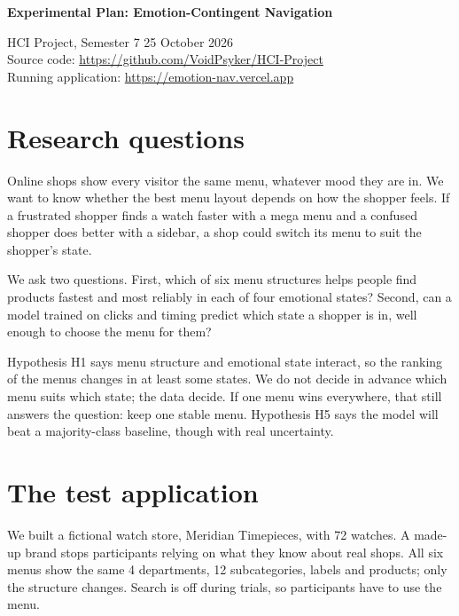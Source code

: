 \documentclass[10pt,a4paper]{article}
\begin{document}
{\LARGE\bfseries Experimental Plan: Emotion-Contingent Navigation}\par
\vspace{2pt}
HCI Project, Semester 7 \textperiodcentered{} 25 October 2026\\
Source code: \url{https://github.com/VoidPsyker/HCI-Project}\\
Running application: \url{https://emotion-nav.vercel.app}

\section{Research questions}

Online shops show every visitor the same menu, whatever mood they are in. We want to know
whether the best menu layout depends on how the shopper feels. If a frustrated shopper finds
a watch faster with a mega menu and a confused shopper does better with a sidebar, a shop
could switch its menu to suit the shopper's state.

We ask two questions. First, which of six menu structures helps people find products fastest
and most reliably in each of four emotional states? Second, can a model trained on clicks
and timing predict which state a shopper is in, well enough to choose the menu for them?

Hypothesis H1 says menu structure and emotional state interact, so the ranking of the menus
changes in at least some states. We do not decide in advance which menu suits which state;
the data decide. If one menu wins everywhere, that still answers the question: keep one
stable menu. Hypothesis H5 says the model will beat a majority-class baseline, though with
real uncertainty.

\section{The test application}

We built a fictional watch store, Meridian Timepieces, with 72 watches. A made-up brand
stops participants relying on what they know about real shops. All six menus show the same
4 departments, 12 subcategories, labels and products; only the structure changes. Search is
off during trials, so participants have to use the menu.
\end{document}
